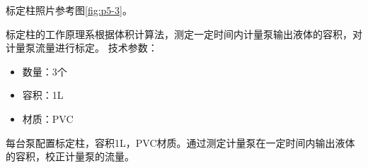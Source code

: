
%
%
%        
%

\par 标定柱照片参考图\ref{fig:p5-3}。
\par 标定柱的工作原理系根据体积计算法，测定一定时间内计量泵输出液体的容积，对计量泵流量进行标定。
技术参数：
\begin{itemize}
    \item 数量：3个
    \item 容积：1L
    \item 材质：PVC
\end{itemize}


        每台泵配置标定柱，容积1L，PVC材质。通过测定计量泵在一定时间内输出液体的容积，校正计量泵的流量。
